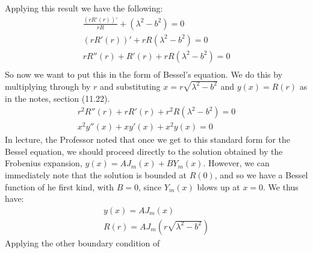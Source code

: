 \documentclass{article}
\begin{document}
Applying this result we have the following:
\begin{equation}
\begin{aligned}
\frac{(rR'(r))'}{rR} +(\lambda^2 - b^2) = 0\\ 
(rR'(r))' + rR(\lambda^2 - b^2) = 0\\
rR''(r) + R'(r) + rR(\lambda^2 - b^2) = 0\\ 
\end{aligned}
\end{equation}
So now we want to put this in the form of Bessel's equation. We do this by multiplying through by $r$ and substituting $x = r\sqrt{\lambda^2-b^2}$ and $y(x) = R(r)$ as in the notes, section (11.22). 
\begin{equation}
\begin{aligned}
r^2R''(r) + rR'(r) + r^2R(\lambda^2 - b^2) = 0\\ 
x^2y''(x) + xy'(x) + x^2y(x) = 0
\end{aligned}
\end{equation}
In lecture, the Professor noted that once we get to this standard form for the Bessel equation, we should proceed directly to the solution obtained by the Frobenius expansion, $y(x) = AJ_m(x) + BY_m(x)$. However, we can immediately note that the solution is bounded at $R(0)$, and so we have a Bessel function of he first kind, with $B=0$, since $Y_m(x)$ blows up at $x=0$. We thus have:
\begin{equation}
\begin{aligned}
y(x) = AJ_m(x)\\
R(r) = AJ_m(r\sqrt{\lambda^2 - b^2})
\end{aligned}
\end{equation}
Applying the other boundary condition of 
\end{document}
